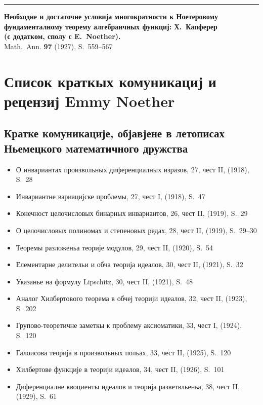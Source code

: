 ﻿\documentclass[11pt]{article}
\newcommand{\foreign}[1]{#1}
\begin{document}
\vspace{1em}
\noindent\rule{\textwidth}{0.4pt}
\vspace{0.5em}

\noindent\textbf{Необходне и достаточне условија многократности к Ноетеровому}\\
\textbf{фундаменталному теорему алгебраичных функциј: Х.\ Капферер}\\
\textbf{(с додатком, сполу с E.\ Noether).}\\
\foreign{Math.\ Ann.} \textbf{97} (1927), S.~559--567

\newpage
\section*{Список краткых комуникациј и рецензиј Emmy Noether}

\subsection*{Кратке комуникације, објавјене в летописах Ньемецкого математичного дружства}

\begin{itemize}[leftmargin=1.5em,itemsep=0.2em]
\item О инвариантах произвольных диференциалных изразов, 27, чест II, (1918), S.~28
\item Инвариантне вариацијске проблемы, 27, чест I, (1918), S.~47
\item Конечност целочисловых бинарных инвариантов, 26, чест II, (1919), S.~29
\item О целочисловых полиномах и степеновых редах, 28, чест II, (1919), S.~29--30
\item Теоремы разложеньа теорије модулов, 29, чест II, (1920), S.~54
\item Елементарне делительи и обча теорија идеалов, 30, чест II, (1921), S.~32
\item Указанье на формулу Lipschitz, 30, чест II, (1921), S.~48
\item Аналог Хилбертового теорема в обчеј теорији идеалов, 32, чест II, (1923), S.~202
\item Групово-теоретичне заметкы к проблему аксиоматики, 33, чест I, (1924), S.~120
\item Галоисова теорија в произвольных польах, 33, чест II, (1925), S.~120
\item Хилбертове функције в теорији идеалов, 34, чест II, (1926), S.~101
\item Диференциалне квоциенты идеалов и теорија разветвльеньа, 38, чест II, (1929), S.~61
\end{itemize}
\end{document}
